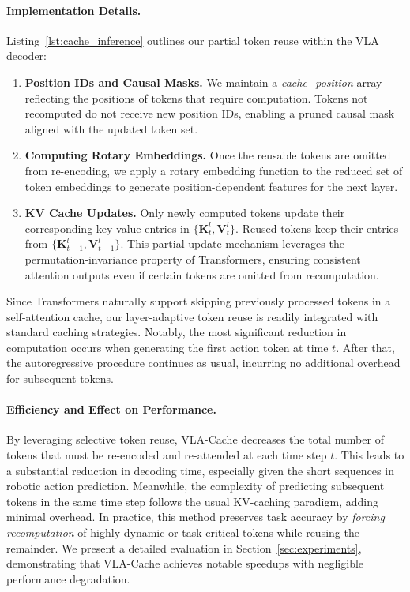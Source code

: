 \paragraph{Implementation Details.}
Listing~\ref{lst:cache_inference} outlines our partial token reuse within the VLA decoder:
\begin{enumerate}
\label{lst:cache_inference}
    \item \textbf{Position IDs and Causal Masks.} We maintain a \emph{cache\_position} array reflecting the positions of tokens that require computation. Tokens not recomputed do not receive new position IDs, enabling a pruned causal mask aligned with the updated token set.
    \item \textbf{Computing Rotary Embeddings.} Once the reusable tokens are omitted from re-encoding, we apply a rotary embedding function to the reduced set of token embeddings to generate position-dependent features for the next layer.
    \item \textbf{KV Cache Updates.} Only newly computed tokens update their corresponding key-value entries in \(\{\mathbf{K}_t^l,\mathbf{V}_t^l\}\). Reused tokens keep their entries from \(\{\mathbf{K}_{t-1}^l,\mathbf{V}_{t-1}^l\}\). This partial-update mechanism leverages the permutation-invariance property of Transformers, ensuring consistent attention outputs even if certain tokens are omitted from recomputation.
\end{enumerate}

Since Transformers naturally support skipping previously processed tokens in a self-attention cache, our layer-adaptive token reuse is readily integrated with standard caching strategies. Notably, the most significant reduction in computation occurs when generating the first action token at time \(t\). After that, the autoregressive procedure continues as usual, incurring no additional overhead for subsequent tokens.

\paragraph{Efficiency and Effect on Performance.}
By leveraging selective token reuse, VLA-Cache decreases the total number of tokens that must be re-encoded and re-attended at each time step \(t\). This leads to a substantial reduction in decoding time, especially given the short sequences in robotic action prediction. Meanwhile, the complexity of predicting subsequent tokens in the same time step follows the usual KV-caching paradigm, adding minimal overhead. In practice, this method preserves task accuracy by \emph{forcing recomputation} of highly dynamic or task-critical tokens while reusing the remainder. We present a detailed evaluation in Section~\ref{sec:experiments}, demonstrating that VLA-Cache achieves notable speedups with negligible performance degradation.


